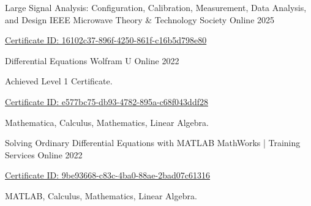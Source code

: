 

\begin{cventries}

	\cventry
	{Large Signal Analysis: Configuration, Calibration, Measurement, Data Analysis, and Design} %
	{IEEE Microwave Theory \& Technology Society} %
	{Online} %
	{2025} %
	{
		\begin{cvitems} %
			\item {\href{https://www.credential.net/16102c37-896f-4250-861f-c16b5d798e80/}{Certificate ID: 16102c37-896f-4250-861f-c16b5d798e80}}
		\end{cvitems}
	}
	
	
	\cventry
	{Differential Equations} %
	{Wolfram U} %
	{Online} %
	{2022} %
	{
		\begin{cvitems} %
			\item {Achieved Level 1 Certificate.}
			\item {\href{https://www.wolframcloud.com/obj/online-courses/certificates/introduction-to-differential-equations/e577bc75-db93-4782-895a-c68f043ddf28/1.html}{Certificate ID: e577bc75-db93-4782-895a-c68f043ddf28}}
			\item { Mathematica, Calculus, Mathematics, Linear Algebra.}
		\end{cvitems}
	}
	
	
	\cventry
	{Solving Ordinary Differential Equations with MATLAB} %
	{MathWorks | Training Services} %
	{Online} %
	{2022} %
	{
		\begin{cvitems} %
			\item {\href{https://matlabacademy.mathworks.com/progress/share/certificate.html?id=9be93668-c83c-4ba0-88ae-2bad07c61316\&/}{Certificate ID: 9be93668-c83c-4ba0-88ae-2bad07c61316}}
			\item { MATLAB, Calculus, Mathematics, Linear Algebra.}
		\end{cvitems}
	}
	

\end{cventries}
